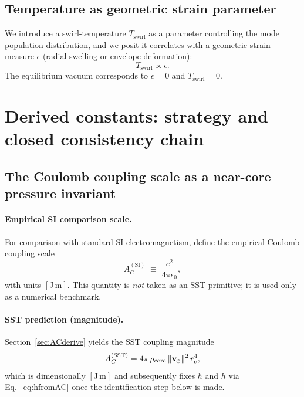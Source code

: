 \documentclass[pdflatex,sn-mathphys-num]{revtex4-2}
\newcommand{\swirlarrow}{\mathchoice{\mkern-2mu\scriptstyle\boldsymbol{\circlearrowleft}}{\mkern-2mu\scriptstyle\boldsymbol{\circlearrowleft}}{\mkern-2mu\scriptscriptstyle\boldsymbol{\circlearrowleft}}{\mkern-2mu\scriptscriptstyle\boldsymbol{\circlearrowleft}}}
\newcommand{\rhocore}{\rho_{\text{core}}}
\newcommand{\vswirl}{\mathbf{v}_{\swirlarrow}}
\newcommand{\vnorm}{\lVert \vswirl \rVert}
\providecommand{\rc}{r_c}
\begin{document}
    \subsection{Temperature as geometric strain parameter}
        We introduce a swirl-temperature \(T_{\text{swirl}}\) as a parameter controlling the mode population distribution,
        and we posit it correlates with a geometric strain measure \(\epsilon\) (radial swelling or envelope deformation):
        \begin{equation}
            T_{\text{swirl}} \propto \epsilon.
            \label{eq:Tswirl}
        \end{equation}
        The equilibrium vacuum corresponds to \(\epsilon=0\) and \(T_{\text{swirl}}=0\).

    \section{Derived constants: strategy and closed consistency chain}

    \subsection{The Coulomb coupling scale as a near-core pressure invariant}

    \paragraph{Empirical SI comparison scale.}
        For comparison with standard SI electromagnetism, define the empirical Coulomb coupling scale
        \begin{equation}
            A_C^{\mathrm{(SI)}} \;\equiv\; \frac{e^2}{4\pi\epsilon_0},
            \label{eq:ACdef}
        \end{equation}
        with units \([\mathrm{J\,m}]\).
        This quantity is \emph{not} taken as an SST primitive; it is used only as a numerical benchmark.

    \paragraph{SST prediction (magnitude).}
        Section~\ref{sec:ACderive} yields the SST coupling magnitude
        \[
        A_C^{\mathrm{(SST)}} = 4\pi\,\rhocore\,\vnorm^2\,\rc^4,
        \]
        which is dimensionally \([\mathrm{J\,m}]\) and subsequently fixes \(\hbar\) and \(h\) via Eq.~\eqref{eq:hfromAC}
        once the identification step below is made.
\end{document}
